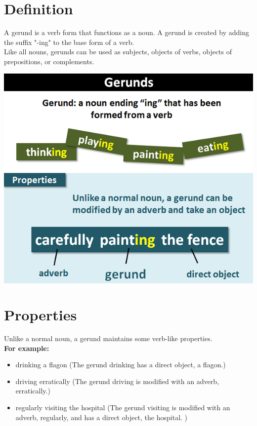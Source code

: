 \chapter{Definition}
A gerund is a verb form that functions as a noun. A gerund is created by adding the suffix "-ing" to the base form of a verb. 
\\Like all nouns, gerunds can be used as subjects, objects of verbs, objects of prepositions, or complements.\\
\begin{center}  
    \includegraphics[scale=0.5]{project-folders/Gerunds/gerunds.png}
\end{center}

\chapter{Properties}
Unlike a normal noun, a gerund maintains some verb-like properties.\\
\textbf{For example:} 
\begin{itemize}
    \item drinking a flagon (The gerund drinking has a direct object, a flagon.)
    \item driving erratically (The gerund driving is modified with an adverb, erratically.)
    \item regularly visiting the hospital (The gerund visiting is modified with an adverb, regularly, and has a direct object, the hospital. )
\end{itemize}